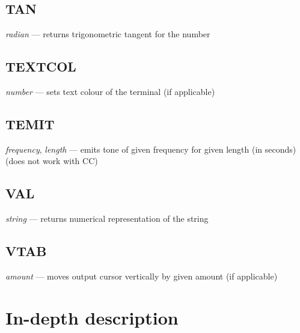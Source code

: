 \subsection{TAN} \emph{radian} --- returns trigonometric tangent for the number
\subsection{TEXTCOL} \emph{number} --- sets text colour of the terminal (if applicable)
\subsection{TEMIT} \emph{frequency}, \emph{length} --- emits tone of given frequency for given length (in seconds) (does not work with CC)
\subsection{VAL} \emph{string} --- returns numerical representation of the string
\subsection{VTAB} \emph{amount} --- moves output cursor vertically by given amount (if applicable)

\section{In-depth description}